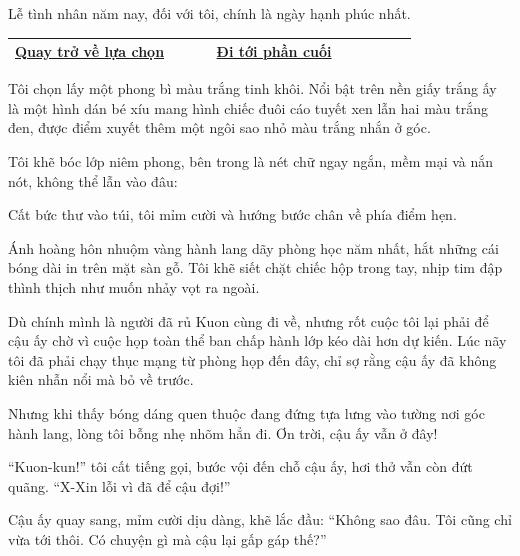 \documentclass[../main.tex]{subfiles}
\begin{document}
Lễ tình nhân năm nay, đối với tôi, chính là ngày hạnh phúc nhất.

\begin{table}[H]
  \centering
  \setlength{\arrayrulewidth}{1pt}
  \begin{tabular}{|>{\centering\arraybackslash}p{0.4\linewidth}|>{\centering\arraybackslash}p{0.4\linewidth}|}
    \hline
    \hyperref[choice]{Quay trở về lựa chọn} & \hyperref[ending]{Đi tới phần cuối} \\ \hline
  \end{tabular}
\end{table}

\newpage
\label{inari}

Tôi chọn lấy một phong bì màu trắng tinh khôi. Nổi bật trên nền giấy trắng ấy là một hình dán bé xíu mang hình chiếc đuôi cáo tuyết xen lẫn hai màu trắng đen, được điểm xuyết thêm một ngôi sao nhỏ màu trắng nhắn ở góc.

Tôi khẽ bóc lớp niêm phong, bên trong là nét chữ ngay ngắn, mềm mại và nắn nót, không thể lẫn vào đâu:


Cất bức thư vào túi, tôi mỉm cười và hướng bước chân về phía điểm hẹn.

\ct


Ánh hoàng hôn nhuộm vàng hành lang dãy phòng học năm nhất, hắt những cái bóng dài in trên mặt sàn gỗ. Tôi khẽ siết chặt chiếc hộp trong tay, nhịp tim đập thình thịch như muốn nhảy vọt ra ngoài.

Dù chính mình là người đã rủ Kuon cùng đi về, nhưng rốt cuộc tôi lại phải để cậu ấy chờ vì cuộc họp toàn thể ban chấp hành lớp kéo dài hơn dự kiến. Lúc nãy tôi đã phải chạy thục mạng từ phòng họp đến đây, chỉ sợ rằng cậu ấy đã không kiên nhẫn nổi mà bỏ về trước.

Nhưng khi thấy bóng dáng quen thuộc đang đứng tựa lưng vào tường nơi góc hành lang, lòng tôi bỗng nhẹ nhõm hẳn đi. Ơn trời, cậu ấy vẫn ở đây!

``Kuon-kun!'' tôi cất tiếng gọi, bước vội đến chỗ cậu ấy, hơi thở vẫn còn đứt quãng. ``X-Xin lỗi vì đã để cậu đợi!''

Cậu ấy quay sang, mỉm cười dịu dàng, khẽ lắc đầu: ``Không sao đâu. Tôi cũng chỉ vừa tới thôi. Có chuyện gì mà cậu lại gấp gáp thế?''
\end{document}
